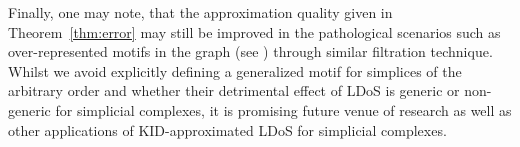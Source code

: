 Finally, one may note, that the approximation quality given in Theorem~\ref{thm:error} may still be improved in the pathological scenarios such as over-represented motifs in the graph (see \cite{dong2019network}) through similar filtration technique. Whilst we avoid explicitly defining a generalized motif for simplices of the arbitrary order and whether their detrimental effect of LDoS is generic or non-generic for simplicial complexes, it is promising future venue of research as well as other applications of KID-approximated LDoS for simplicial complexes.